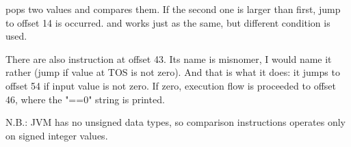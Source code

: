  pops two values and compares them. If the second one is larger than first, 
jump to offset 14 is occurred.
 and  works just as the same, but different condition is used.

There are also  instruction at offset 43. 
Its name is misnomer, I would name it rather  (jump if value at \ac{TOS} is not zero).
And that is what it does: it jumps to offset 54 if input value is not zero.
If zero, execution flow is proceeded to offset 46, where the "==0" string is printed.

N.B.: \ac{JVM} has no unsigned data types, so comparison instructions operates 
only on signed integer values.
